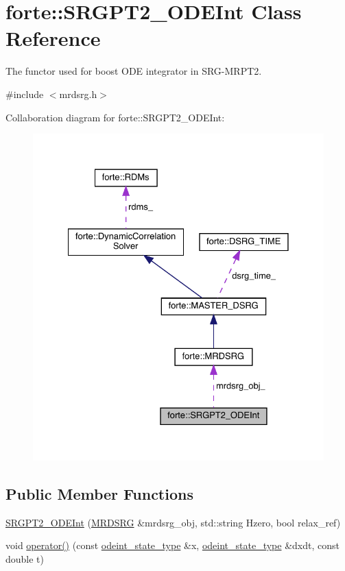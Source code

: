 \hypertarget{classforte_1_1_s_r_g_p_t2___o_d_e_int}{}\section{forte\+:\+:S\+R\+G\+P\+T2\+\_\+\+O\+D\+E\+Int Class Reference}
\label{classforte_1_1_s_r_g_p_t2___o_d_e_int}


The functor used for boost O\+DE integrator in S\+R\+G-\/\+M\+R\+P\+T2.  




{\ttfamily \#include $<$mrdsrg.\+h$>$}



Collaboration diagram for forte\+:\+:S\+R\+G\+P\+T2\+\_\+\+O\+D\+E\+Int\+:
\nopagebreak
\begin{figure}[H]
\begin{center}
\leavevmode
\includegraphics[width=328pt]{classforte_1_1_s_r_g_p_t2___o_d_e_int__coll__graph}
\end{center}
\end{figure}
\subsection*{Public Member Functions}
\begin{DoxyCompactItemize}
\item 
\mbox{\hyperlink{classforte_1_1_s_r_g_p_t2___o_d_e_int_a0dec9b83e1c41b1ce3760292b7fda0e3}{S\+R\+G\+P\+T2\+\_\+\+O\+D\+E\+Int}} (\mbox{\hyperlink{classforte_1_1_m_r_d_s_r_g}{M\+R\+D\+S\+RG}} \&mrdsrg\+\_\+obj, std\+::string Hzero, bool relax\+\_\+ref)
\item 
void \mbox{\hyperlink{classforte_1_1_s_r_g_p_t2___o_d_e_int_a173154c828c5820f5520409938a0ca82}{operator()}} (const \mbox{\hyperlink{namespaceforte_ad8fa2d4b40cee55f959c09c9be68a63e}{odeint\+\_\+state\+\_\+type}} \&x, \mbox{\hyperlink{namespaceforte_ad8fa2d4b40cee55f959c09c9be68a63e}{odeint\+\_\+state\+\_\+type}} \&dxdt, const double t)
\end{DoxyCompactItemize}
